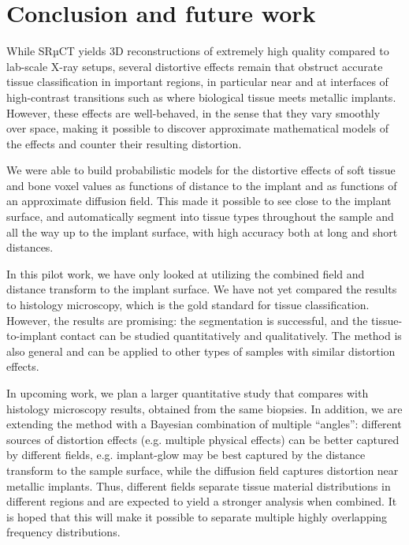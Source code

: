 \section{Conclusion and future work}
\label{sec:conclusion}

While SRµCT yields 3D reconstructions of extremely high quality compared to
lab-scale X-ray setups, several distortive effects remain that obstruct
accurate tissue classification in important regions, in particular near and at
interfaces of high-contrast transitions such as where biological tissue meets
metallic implants. However, these effects are well-behaved, in the sense that
they vary smoothly over space, making it possible to discover approximate
mathematical models of the effects and counter their resulting distortion.

We were able to build probabilistic models for the distortive effects of soft
tissue and bone voxel values as functions of distance to the implant and as
functions of an approximate diffusion field. This made it possible to see close
to the implant surface, and automatically segment into tissue types throughout
the sample and all the way up to the implant surface, with high accuracy both
at long and short distances.

In this pilot work, we have only looked at utilizing the combined field and
distance transform to the implant surface. We have not yet compared the results
to histology microscopy, which is the gold standard for tissue classification.
However, the results are promising: the segmentation is successful, and the
tissue-to-implant contact can be studied quantitatively and qualitatively. The
method is also general and can be applied to other types of samples with
similar distortion effects.

In upcoming work, we plan a larger quantitative study that compares with
histology microscopy results, obtained from the same biopsies. In addition, we
are extending the method with a Bayesian combination of multiple ``angles'':
different sources of distortion effects (e.g. multiple physical effects) can be
better captured by different fields, e.g. implant-glow may be best captured
by the distance transform to the sample surface, while the diffusion field
captures distortion near metallic implants. Thus, different fields separate
tissue material distributions in different regions and are expected to yield a
stronger analysis when combined. It is hoped that this will make it possible to
separate multiple highly overlapping frequency distributions.


